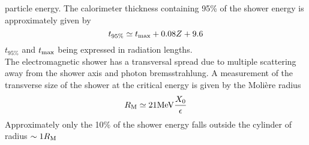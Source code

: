 particle energy. The calorimeter thickness containing 95\% of the shower energy
is approximately given by
\begin{equation}\label{eq:95tickness}
t_{95\%} \simeq t_{\rm max}+0.08Z+9.6
\end{equation}
$t_{95\%}$ and $t_{\rm max}$ being expressed in radiation lengths.\\
The electromagnetic shower has a transversal spread due to multiple scattering
away from the shower axis and photon bremsstrahlung. A measurement of the
transverse size of the shower at the critical energy is given by the Moli\`ere radius
\begin{equation}\label{eq:moliere_radius}
R_{\rm M} \simeq 21 {\rm MeV} \frac{X_0}{\epsilon}
\end{equation}
Approximately only the 10\% of the shower energy falls outside the cylinder of
radius $\sim 1 R_{\rm M} $


{ \color{red}


}

